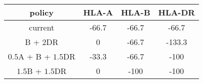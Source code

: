 	\begin{tabular}{@{}cccc@{}}
		\toprule
		policy & HLA-A &
		HLA-B & HLA-DR \\
		\midrule
		current & -66.7     & -66.7     & -66.7\\
		B + 2DR & 0     & -66.7     & -133.3 \\
		$0.5$A + B + $1.5$DR & -33.3 & -66.7     & -100 \\
		$1.5$B + $1.5$DR & 0     & -100     & -100\\
		\bottomrule
	\end{tabular}

